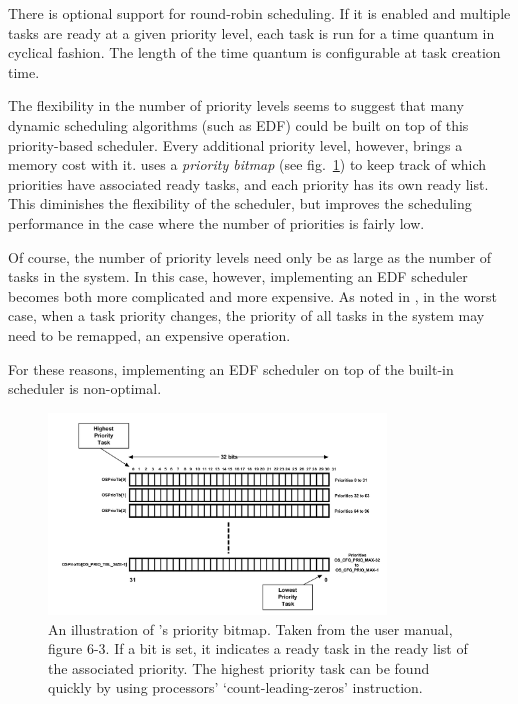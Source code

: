 There is optional support for round-robin scheduling. If it is enabled and multiple tasks are ready at a given priority level, each task is run for a time quantum in cyclical fashion. The length of the time quantum is configurable at task creation time.

The flexibility in the number of priority levels seems to suggest that many dynamic scheduling algorithms (such as EDF) could be built on top of this priority-based scheduler. Every additional priority level, however, brings a memory cost with it. \ucos uses a \textit{priority bitmap} (see fig.~\ref{fig:priobitmap}) to keep track of which priorities have associated ready tasks, and each priority has its own ready list. This diminishes the flexibility of the scheduler, but improves the scheduling performance in the case where the number of priorities is fairly low.

Of course, the number of priority levels need only be as large as the number of tasks in the system. In this case, however, implementing an EDF scheduler becomes both more complicated and more expensive. As noted in \textcite[\S 2]{Buttazzo2005}, in the worst case, when a task priority changes, the priority of all tasks in the system may need to be remapped, an expensive operation.

For these reasons, implementing an EDF scheduler on top of the built-in scheduler is non-optimal.

\begin{figure}[ht]
    \centering
    \includegraphics[width=0.8\textwidth]{figures/priobitmap.png}
    \caption{An illustration of \ucosiii's priority bitmap. Taken from the user manual, figure 6-3. If a bit is set, it indicates a ready task in the ready list of the associated priority. The highest priority task can be found quickly by using processors' `count-leading-zeros' instruction.}
    \label{fig:priobitmap}
\end{figure}


